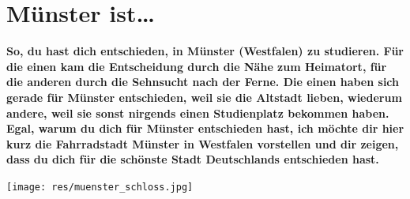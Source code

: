 \section{Münster ist\dots}
\textbf{So, du hast dich entschieden, in Münster (Westfalen) zu studieren. Für die einen kam die Entscheidung durch die Nähe zum Heimatort, für die anderen durch die Sehnsucht nach der Ferne. Die einen haben sich gerade für Münster entschieden, weil sie die Altstadt lieben, wiederum andere, weil sie sonst nirgends einen Studienplatz bekommen haben. Egal, warum du dich für Münster entschieden hast, ich möchte dir hier kurz die Fahrradstadt Münster in Westfalen vorstellen und dir zeigen, dass du dich für die schönste Stadt Deutschlands entschieden hast.}

\vspace{-1.75ex}
\begin{center}
	\texttt{[image: res/muenster\_schloss.jpg]}
\end{center}
\vspace{-1.75ex}

